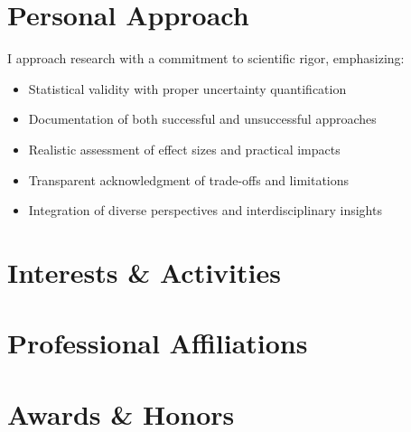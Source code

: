 \documentclass[11pt,a4paper,sans]{moderncv}
\begin{document}
\section{Personal Approach}
I approach research with a commitment to scientific rigor, emphasizing:
\begin{itemize}
  \item Statistical validity with proper uncertainty quantification
  \item Documentation of both successful and unsuccessful approaches
  \item Realistic assessment of effect sizes and practical impacts
  \item Transparent acknowledgment of trade-offs and limitations
  \item Integration of diverse perspectives and interdisciplinary insights
\end{itemize}

\section{Interests \& Activities}

\section{Professional Affiliations}

\section{Awards \& Honors}
\end{document}

